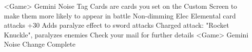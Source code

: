 <Game> Gemini Noise 
Tag Cards are cards you set on the Custom Screen 
to make them more likely to appear in battle 
Non-dimming Elec Elemental card attacks +30 
Adds paralyze effect to sword attacks 
Charged attack: "Rocket Knuckle", paralyzes enemies 
Check your mail for further details 
<Game> Gemini Noise Change Complete 
